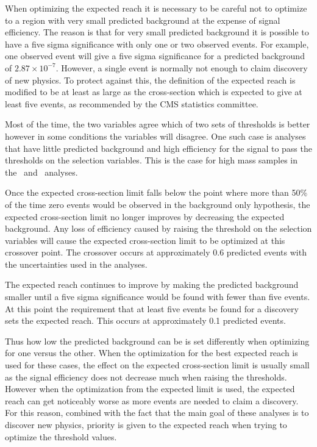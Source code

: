 When optimizing the expected reach it is necessary to be careful not to optimize to
a region with very small predicted background at the expense of signal efficiency. 
The reason is that for very small predicted background it is possible to have a five sigma
significance with only one or two observed events. For example, one observed event will give a five sigma significance for a predicted background of $2.87\times10^{-7}$.
However, a single event is normally not enough to claim discovery of new physics.
To protect against this, the definition of the expected reach is modified to be at least as large as
the cross-section which is expected to give at least five events, as recommended by the CMS statistics committee.

Most of the time, the two variables agree which of two sets of thresholds is better however in some
conditions the variables will disagree. One such case is analyses that have little predicted background and high efficiency for the signal to pass the thresholds on the
selection variables. This is the case for high mass samples in the \tktof\  and \tkonly\ analyses.

Once the expected cross-section limit falls below the point where more than 50\% of the time zero events would be observed in the background only hypothesis,
the expected cross-section limit no longer improves
by decreasing the expected background. Any loss of efficiency caused by raising the threshold on the selection variables will cause the expected cross-section limit to be optimized
at this crossover point. The crossover occurs at approximately 0.6 predicted events with the uncertainties used in the analyses. 

The expected reach continues to improve by making the predicted background smaller until a five sigma significance would be found with fewer than five events. At this
point the requirement that at least five events be found for a discovery sets the expected reach.
This occurs at approximately 0.1 predicted events. 

Thus how low the predicted background can be is set differently when optimizing for one versus the other.
When the optimization for the best expected reach is used for these cases, the
effect on the expected cross-section limit is usually small as the signal efficiency does not decrease much when raising the thresholds. However
when the optimization from the expected limit is used, the expected reach can get noticeably worse as more events are needed to claim a discovery.
For this reason, combined with the fact that the main goal of these analyses is to discover new physics, priority
is given to the expected reach when trying to optimize the threshold values.

